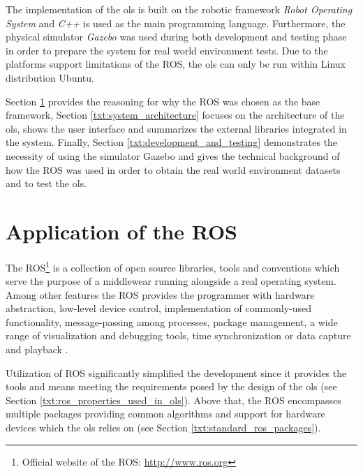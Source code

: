 The implementation of the \gls{ols} is built on the robotic framework \textit{Robot Operating System} and \textit{C++} is used as the main programming language. Furthermore, the physical simulator \textit{Gazebo} was used during both development and testing phase in order to prepare the system for real world environment tests. Due to the platforms support limitations of the ROS, the \gls{ols} can only be run within Linux distribution Ubuntu.

Section \ref{txt:application_of_ros} provides the reasoning for why the ROS was chosen as the base framework, Section \ref{txt:system_architecture} focuses on the architecture of the \gls{ols}, shows the user interface and summarizes the external libraries integrated in the system. Finally, Section \ref{txt:development_and_testing} demonstrates the necessity of using the simulator Gazebo and gives the technical background of how the ROS was used in order to obtain the real world environment datasets and to test the \gls{ols}.

\section{Application of the ROS} \label{txt:application_of_ros}

The ROS\footnote{Official website of the ROS: \url{http://www.ros.org}} is a collection of open source libraries, tools and conventions which serve the purpose of a middlewear running alongside a real operating system. Among other features the ROS provides the programmer with hardware abstraction, low-level device control, implementation of commonly-used functionality, message-passing among processes, package management, a wide range of visualization and debugging tools, time synchronization or data capture and playback \cite{O'Kane201310}.

Utilization of ROS significantly simplified the development since it provides the tools and means meeting the requirements posed by the design of the \gls{ols} (see Section \ref{txt:ros_properties_used_in_ols}). Above that, the ROS encompasses multiple packages providing common algorithms and support for hardware devices which the \gls{ols} relies on (see Section \ref{txt:standard_ros_packages}).

